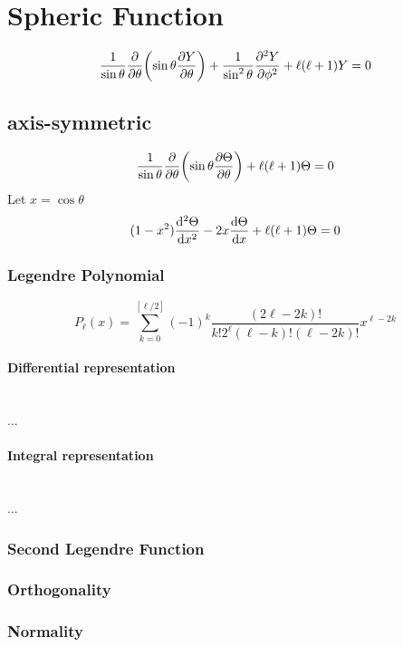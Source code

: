 \documentclass[UTF8]{ctexart} %
\numberwithin{equation}{section}
\begin{document}
\section{Spheric Function}
\begin{equation}\label{key}
\dfrac{1}{\sin\theta}\pdv{\theta}\qty(\sin\theta\pdv{Y}{\theta}) + \dfrac{1}{\sin^2 \theta}\pdv[2]{Y}{\phi} + \ell(\ell + 1)Y = 0
\end{equation}
\subsection{axis-symmetric}
\begin{equation}\label{key}
\dfrac{1}{\sin\theta}\pdv{\theta}\qty(\sin\theta\pdv{\Theta}{\theta})  + \ell(\ell + 1)\Theta = 0
\end{equation}
Let $x=\cos\theta$
\begin{equation}\label{key}
(1-x^2)\dv[2]{\Theta}{x} - 2x\dv{\Theta}{x} + \ell(\ell +1)\Theta = 0
\end{equation}
\subsubsection{Legendre Polynomial}
\begin{equation}\label{key}
P_\ell(x) = \sum_{k=0}^{[\ell/2]}(-1)^k \dfrac{(2\ell - 2k)!}{k!2^\ell (\ell - k)!(\ell - 2k)!}x^{\ell - 2k}
\end{equation}
\paragraph{Differential representation}~\\
...\\
\paragraph{Integral representation}~\\
...\\

\subsubsection{Second Legendre Function}

\subsubsection{Orthogonality}

\subsubsection{Normality}
\end{document}
